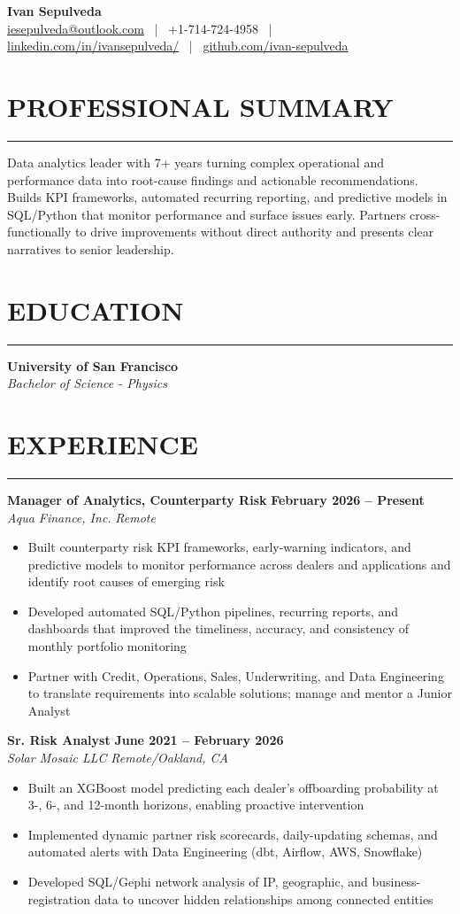 \documentclass[10.5pt,letterpaper]{article}
\newcommand{\ressection}[1]{%
	\vspace{1.5mm}
	\section*{#1}
	\vspace{0.5mm}
	\hrule
	\vspace{1mm}
}
\newenvironment{myitemize}
{ \begin{itemize}[label={\textbullet}, leftmargin=*, topsep=1pt, partopsep=0pt, itemsep=1pt, parsep=0pt] }
	{ \end{itemize}                  }
\begin{document}
\begin{center}
	{\LARGE \textbf{Ivan Sepulveda}}\\[3pt]
	\href{mailto:iesepulveda@outlook.com}{iesepulveda@outlook.com} ~|~ +1-714-724-4958 ~|~ \href{https://www.linkedin.com/in/ivansepulveda/}{linkedin.com/in/ivansepulveda/} ~|~ \href{https://github.com/ivan-sepulveda}{github.com/ivan-sepulveda}
\end{center}

\ressection{PROFESSIONAL SUMMARY}
Data analytics leader with 7+ years turning complex operational and performance data into root-cause findings and actionable recommendations. Builds KPI frameworks, automated recurring reporting, and predictive models in SQL/Python that monitor performance and surface issues early. Partners cross-functionally to drive improvements without direct authority and presents clear narratives to senior leadership.

\ressection{EDUCATION}
\noindent\textbf{University of San Francisco} \\
\textit{Bachelor of Science - Physics}

\ressection{EXPERIENCE}

\noindent\textbf{Manager of Analytics, Counterparty Risk} \hfill \textbf{February 2026 -- Present} \\
\textit{Aqua Finance, Inc.} \hfill \textit{Remote}
\begin{myitemize}
	\item Built counterparty risk KPI frameworks, early-warning indicators, and predictive models to monitor performance across dealers and applications and identify root causes of emerging risk
	\item Developed automated SQL/Python pipelines, recurring reports, and dashboards that improved the timeliness, accuracy, and consistency of monthly portfolio monitoring
	\item Partner with Credit, Operations, Sales, Underwriting, and Data Engineering to translate requirements into scalable solutions; manage and mentor a Junior Analyst
\end{myitemize}

\noindent\textbf{Sr. Risk Analyst} \hfill \textbf{June 2021 -- February 2026} \\
\textit{Solar Mosaic LLC} \hfill \textit{Remote/Oakland, CA}
\begin{myitemize}
	\item Built an XGBoost model predicting each dealer's offboarding probability at 3-, 6-, and 12-month horizons, enabling proactive intervention
	\item Implemented dynamic partner risk scorecards, daily-updating schemas, and automated alerts with Data Engineering (dbt, Airflow, AWS, Snowflake)
	\item Developed SQL/Gephi network analysis of IP, geographic, and business-registration data to uncover hidden relationships among connected entities
\end{myitemize}
\end{document}
